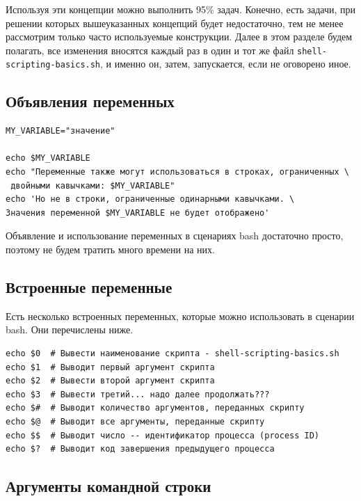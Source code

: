 \documentclass[a4paper,12pt,final,openany]{extbook}
\begin{document}
Используя эти концепции можно выполнить 95\% задач. Конечно, есть
задачи, при решении которых вышеуказанных концепций будет недостаточно,
тем не менее рассмотрим только часто используемые конструкции. Далее в этом разделе будем полагать, все изменения вносятся каждый раз в один и тот же файл
\texttt{shell-scripting-basics.sh}, и именно он, затем, запускается, если не
оговорено иное.

\hypertarget{Variable-declarations}{%
\subsection{\texorpdfstring{\protect\hyperlink{Variable-declarations}{}Объявления
переменных}{Объявления переменных}}\label{Variable-declarations}}

\begin{verbatim}
MY_VARIABLE="значение"

echo $MY_VARIABLE
echo "Переменные также могут использоваться в строках, ограниченных \
 двойными кавычками: $MY_VARIABLE"
echo 'Но не в строки, ограниченные одинарными кавычками. \
Значения переменной $MY_VARIABLE не будет отображено'
\end{verbatim}
Объявление и использование переменных в сценариях bash достаточно
просто, поэтому не будем тратить много времени на них.

\hypertarget{Built-In-Variables}{%
\subsection{\texorpdfstring{\protect\hyperlink{Built-In-Variables}{}Встроенные
переменные}{Встроенные переменные}}\label{Built-In-Variables}}

Есть несколько встроенных переменных, которые можно использовать в
сценарии bash. Они перечислены ниже.

\begin{verbatim}
echo $0  # Вывести наименование скрипта - shell-scripting-basics.sh
echo $1  # Выводит первый аргумент скрипта
echo $2  # Вывести второй аргумент скрипта
echo $3  # Вывести третий... надо далее продолжать???
echo $#  # Выводит количество аргументов, переданных скрипту
echo $@  # Выводит все аргументы, переданные скрипту
echo $$  # Выводит число -- идентификатор процесса (process ID)
echo $?  # Выводит код завершения предыдущего процесса
\end{verbatim}

\hypertarget{Command-Line-Arguments}{%
\subsection{\texorpdfstring{\protect\hyperlink{Command-Line-Arguments}{}Аргументы
командной
строки}{Аргументы командной строки}}\label{Command-Line-Arguments}}
\end{document}
